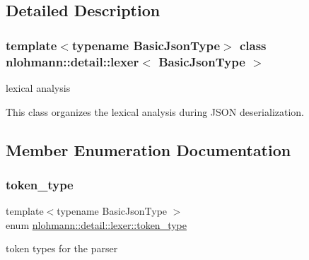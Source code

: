 \subsection{Detailed Description}
\subsubsection*{template$<$typename Basic\+Json\+Type$>$\newline
class nlohmann\+::detail\+::lexer$<$ Basic\+Json\+Type $>$}

lexical analysis 

This class organizes the lexical analysis during J\+S\+ON deserialization. 

\subsection{Member Enumeration Documentation}
\mbox{\label{classnlohmann_1_1detail_1_1lexer_a3f313cdbe187cababfc5e06f0b69b098}} 
\subsubsection{\texorpdfstring{token\+\_\+type}{token\_type}}
{\footnotesize\ttfamily template$<$typename Basic\+Json\+Type $>$ \\
enum \mbox{\hyperlink{classnlohmann_1_1detail_1_1lexer_a3f313cdbe187cababfc5e06f0b69b098}{nlohmann\+::detail\+::lexer\+::token\+\_\+type}}\hspace{0.3cm}{\ttfamily [strong]}}



token types for the parser 

